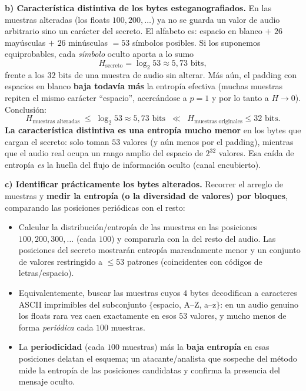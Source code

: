 \medskip
\textbf{b) Característica distintiva de los bytes esteganografiados.} En las muestras alteradas
(los floats $100, 200, \dots$) ya no se guarda un valor de audio arbitrario sino un carácter del
secreto. El alfabeto es: espacio en blanco $+$ $26$ mayúsculas $+$ $26$ minúsculas $= 53$
símbolos posibles. Si los suponemos equiprobables, cada \emph{símbolo} oculto aporta a lo sumo
\begin{equation*}
  H_{\text{secreto}} = \log_2 53 \approx 5{,}73 \text{ bits},
\end{equation*}
frente a los $32$ bits de una muestra de audio sin alterar. Más aún, el padding con espacios en
blanco \textbf{baja todavía más} la entropía efectiva (muchas muestras repiten el mismo carácter
``espacio'', acercándose a $p=1$ y por lo tanto a $H \to 0$). Conclusión:
\begin{equation*}
  H_{\text{muestras alteradas}} \;\le\; \log_2 53 \approx 5{,}73 \text{ bits}
  \;\;\ll\;\; H_{\text{muestras originales}} \le 32 \text{ bits}.
\end{equation*}
\textbf{La característica distintiva es una entropía mucho menor} en los bytes que cargan el
secreto: solo toman $53$ valores (y aún menos por el padding), mientras que el audio real ocupa
un rango amplio del espacio de $2^{32}$ valores. Esa caída de entropía \emph{es} la huella del
flujo de información oculto (canal encubierto).

\medskip
\textbf{c) Identificar prácticamente los bytes alterados.} Recorrer el arreglo de muestras y
\textbf{medir la entropía (o la diversidad de valores) por bloques}, comparando las posiciones
periódicas con el resto:
\begin{itemize}[leftmargin=1.4em,itemsep=2pt]
  \item Calcular la distribución/entropía de las muestras en las posiciones $100,200,300,\dots$
        (cada $100$) y compararla con la del resto del audio. Las posiciones del secreto
        mostrarán entropía marcadamente menor y un conjunto de valores restringido a $\le 53$
        patrones (coincidentes con códigos de letras/espacio).
  \item Equivalentemente, buscar las muestras cuyos $4$ bytes decodifican a caracteres ASCII
        imprimibles del subconjunto $\{$espacio, A--Z, a--z$\}$: en un audio genuino los floats
        rara vez caen exactamente en esos $53$ valores, y mucho menos de forma \emph{periódica}
        cada $100$ muestras.
  \item La \textbf{periodicidad} (cada $100$ muestras) más la \textbf{baja entropía} en esas
        posiciones delatan el esquema; un atacante/analista que sospeche del método mide la
        entropía de las posiciones candidatas y confirma la presencia del mensaje oculto.
\end{itemize}

